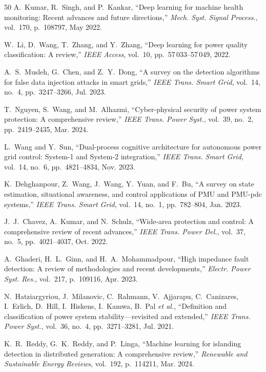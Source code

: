 \documentclass[journal]{IEEEtran}
\begin{document}
\begin{thebibliography}{50}
A.~Kumar, R.~Singh, and P.~Kankar, ``Deep learning for machine health monitoring: Recent advances and future directions,'' \textit{Mech. Syst. Signal Process.}, vol.~170, p.~108797, May 2022.

W.~Li, D.~Wang, T.~Zhang, and Y.~Zhang, ``Deep learning for power quality classification: A review,'' \textit{IEEE Access}, vol.~10, pp.~57\,033--57\,049, 2022.

A.~S.~Musleh, G.~Chen, and Z.~Y.~Dong, ``A survey on the detection algorithms for false data injection attacks in smart grids,'' \textit{IEEE Trans. Smart Grid}, vol.~14, no.~4, pp.~3247--3266, Jul. 2023.

T.~Nguyen, S.~Wang, and M.~Alhazmi, ``Cyber-physical security of power system protection: A comprehensive review,'' \textit{IEEE Trans. Power Syst.}, vol.~39, no.~2, pp.~2419--2435, Mar. 2024.

L.~Wang and Y.~Sun, ``Dual-process cognitive architecture for autonomous power grid control: System-1 and System-2 integration,'' \textit{IEEE Trans. Smart Grid}, vol.~14, no.~6, pp.~4821--4834, Nov. 2023.

K.~Dehghanpour, Z.~Wang, J.~Wang, Y.~Yuan, and F.~Bu, ``A survey on state estimation, situational awareness, and control applications of PMU and PMU-pdc systems,'' \textit{IEEE Trans. Smart Grid}, vol.~14, no.~1, pp.~782--804, Jan. 2023.

J.~J.~Chavez, A.~Kumar, and N.~Schulz, ``Wide-area protection and control: A comprehensive review of recent advances,'' \textit{IEEE Trans. Power Del.}, vol.~37, no.~5, pp.~4021--4037, Oct. 2022.

A.~Ghaderi, H.~L.~Ginn, and H.~A.~Mohammadpour, ``High impedance fault detection: A review of methodologies and recent developments,'' \textit{Electr. Power Syst. Res.}, vol.~217, p.~109116, Apr. 2023.

N.~Hatziargyriou, J.~Milanovic, C.~Rahmann, V.~Ajjarapu, C.~Canizares, I.~Erlich, D.~Hill, I.~Hiskens, I.~Kamwa, B.~Pal \emph{et al.}, ``Definition and classification of power system stability---revisited and extended,'' \textit{IEEE Trans. Power Syst.}, vol.~36, no.~4, pp.~3271--3281, Jul. 2021.

K.~R.~Reddy, G.~K.~Reddy, and P.~Linga, ``Machine learning for islanding detection in distributed generation: A comprehensive review,'' \textit{Renewable and Sustainable Energy Reviews}, vol.~192, p.~114211, Mar. 2024.


\end{thebibliography}
\end{document}
